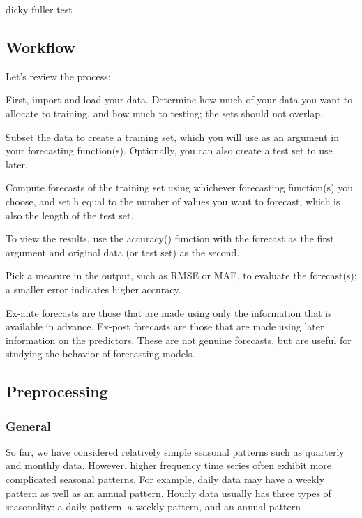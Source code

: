 \documentclass[]{book}
\begin{document}
dicky fuller test

\hypertarget{workflow-1}{%
\subsection{Workflow}\label{workflow-1}}

Let's review the process:

First, import and load your data. Determine how much of your data you want to allocate to training, and how much to testing; the sets should not overlap.

Subset the data to create a training set, which you will use as an argument in your forecasting function(s). Optionally, you can also create a test set to use later.

Compute forecasts of the training set using whichever forecasting function(s) you choose, and set h equal to the number of values you want to forecast, which is also the length of the test set.

To view the results, use the accuracy() function with the forecast as the first argument and original data (or test set) as the second.

Pick a measure in the output, such as RMSE or MAE, to evaluate the forecast(s); a smaller error indicates higher accuracy.

Ex-ante forecasts are those that are made using only the information that is available in advance. Ex-post forecasts are those that are made using later information on the predictors. These are not genuine forecasts, but are useful for studying the behavior of forecasting models.

\hypertarget{preprocessing}{%
\subsection{Preprocessing}\label{preprocessing}}

\hypertarget{general-4}{%
\subsubsection{General}\label{general-4}}

So far, we have considered relatively simple seasonal patterns such as quarterly and monthly data. However, higher frequency time series often exhibit more complicated seasonal patterns. For example, daily data may have a weekly pattern as well as an annual pattern. Hourly data usually has three types of seasonality: a daily pattern, a weekly pattern, and an annual pattern
\end{document}
